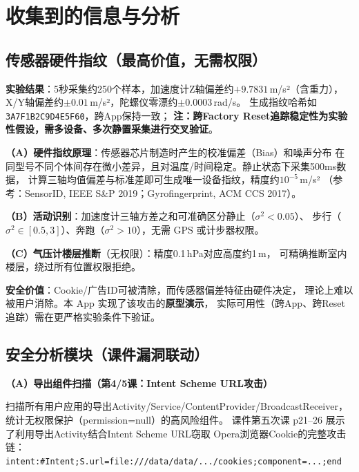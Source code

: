 \documentclass[10pt,a4paper]{article}
\begin{document}
\section{收集到的信息与分析}

\subsection{传感器硬件指纹（最高价值，无需权限）}

\begin{mdframed}[backgroundcolor=lightred,linecolor=highlight,linewidth=1pt,
  innertopmargin=2pt,innerbottommargin=2pt,innerleftmargin=6pt]
\textbf{\color{highlight}实验结果}：5秒采集约250个样本，加速度计Z轴偏差约$+9.7831$\,m/s²（含重力），
X/Y轴偏差约$\pm0.01$\,m/s²，陀螺仪零漂约$\pm0.0003$\,rad/s。
生成指纹哈希如 \texttt{3A7F1B2C9D4E5F60}，跨App保持一致；
\textbf{注：跨Factory Reset追踪稳定性为实验性假设，需多设备、多次静置采集进行交叉验证}。
\end{mdframed}

\noindent\textbf{（A）硬件指纹原理}：传感器芯片制造时产生的校准偏差（Bias）和噪声分布
在同型号不同个体间存在微小差异，且对温度/时间稳定。静止状态下采集500ms数据，
计算三轴均值偏差与标准差即可生成唯一设备指纹，精度约$10^{-5}$\,m/s²
（参考：SensorID, IEEE S\&P 2019；Gyrofingerprint, ACM CCS 2017）。

\noindent\textbf{（B）活动识别}：加速度计三轴方差之和可准确区分静止（$\sigma^2<0.05$）、
步行（$\sigma^2\in[0.5,3]$）、奔跑（$\sigma^2>10$），无需 GPS 或计步器权限。

\noindent\textbf{（C）气压计楼层推断}（无权限）：精度0.1\,hPa对应高度约1\,m，
可精确推断室内楼层，绕过所有位置权限拒绝。

\noindent\textbf{安全价值}：Cookie/广告ID可被清除，而传感器偏差特征由硬件决定，
理论上难以被用户消除。本 App 实现了该攻击的\textbf{原型演示}，
实际可用性（跨App、跨Reset追踪）需在更严格实验条件下验证。

\subsection{安全分析模块（课件漏洞联动）}

\textbf{（A）导出组件扫描（第4/5课：Intent Scheme URL攻击）}

\noindent 扫描所有用户应用的导出Activity/Service/ContentProvider/BroadcastReceiver，
统计无权限保护（permission=null）的高风险组件。
课件第五次课 p21--26 展示了利用导出Activity结合Intent Scheme URL窃取
Opera浏览器Cookie的完整攻击链：
\texttt{intent:\#Intent;S.url=file:///data/data/.../cookies;component=...;end}
\end{document}
